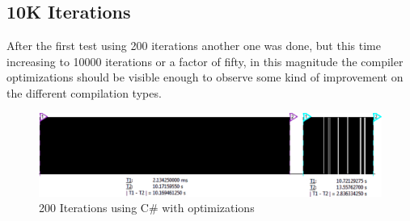 \subsection{10K Iterations}\label{SS:10K-iterations}
After the first test using 200 iterations another one was done, but this time increasing to 10000 iterations or a factor of fifty, in this magnitude the compiler optimizations should be visible enough to observe some kind of improvement on the different compilation types.
\begin{figure}[H]\begin{center}
 \centering
  \captionsetup{justification=centering}
  \includegraphics[width=1\textwidth]{pictures/performance-tests/GPIO/10k/cxx+csharp}
  \caption{200 Iterations using C\# with optimizations \label{fig:gpio-200it-csharp}}
\end{center}\end{figure}
